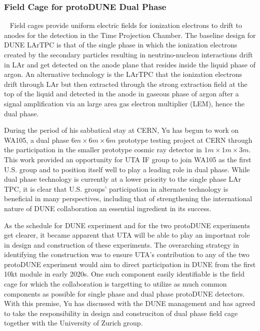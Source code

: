 \subsubsection{Field Cage for protoDUNE Dual Phase}~\label{ss:proto-dune-dp-fc}
Field cages provide uniform electric fields for ionization electrons to drift to anodes for the detection in the Time Projection Chamber.
The baseline design for DUNE LArTPC is that of the single phase in which the ionization electrons created by the secondary particles 
resulting in neutrino-nucleon interactions drift in LAr and get detected on the anode plane that resides inside the liquid phase of argon.  An alternative technology is the LArTPC that the ionization electrons drift through LAr but then extracted through the strong extraction field at the top of the liquid and detected in the anode in gaseous phase of argon after a signal amplification via an large area gas electron multiplier (LEM), hence the dual phase.

During the period of his sabbatical stay at CERN, Yu has begun to work on WA105, a dual phase $6m\times 6m\times 6m$ prototype testing project at CERN through the participation in the smaller prototype cosmic ray detector in $1m\times 1m\times 3m$.  This work provided an opportunity for UTA IF group to join WA105 as the first U.S. group and to position itself well to play a leading role in dual phase.   While dual phase technology is currently at a lower priority to the single phase LAr TPC, it is clear that U.S. groups' participation in alternate technology is beneficial in many perspectives, including that of strengthening the international nature of DUNE collaboration an essential ingredient in its success.

As the schedule for DUNE experiment and for the two protoDUNE experiments get clearer, it became apparent that UTA will be able to play an importnat role in design and construction of these experiments.   The overarching strategy in identifying the construction was to ensure UTA's contribution to any of the two protoDUNE experiment would aim to direct participation in DUNE from the first 10kt module in early 2020s.  One such component easily identifiable is the field cage for which the collaboration is targetting to utilize as much common components as possible for single phase and dual phase protoDUNE detectors.    With this premise, Yu has discussed with the DUNE management and has agreed to take the responsibility in design and construciton of dual phase field cage together with the University of Zurich group.    

